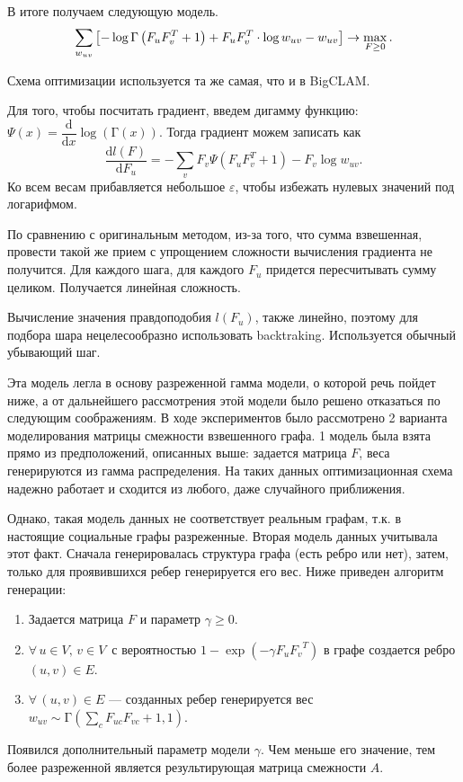 \documentclass{ITaSconf}
\begin{document}
В итоге получаем следующую модель.
$$
\sum_{w_{uv}}\left[-\log\mathrm{\Gamma}\left( F_u F_v^T + 1 \right) + F_u F_v^T \cdot\log w_{uv} - w_{uv}\right] \rightarrow \max_{F\ge 0}. \\
$$

Схема оптимизации используется та же самая, что и в BigCLAM.

Для того, чтобы посчитать градиент, введем дигамму функцию: $\Psi(x) = \dfrac{\mathrm{d}}{\mathrm{d}x} \log\left(\mathrm\Gamma(x)\right)$.
Тогда градиент можем записать как
$$\dfrac{\mathrm{d}l(F)}{\mathrm{d}F_u} = - \sum_v F_v \Psi\left(F_u F_v^T + 1\right) - F_v \log w_{uv}.$$
Ко всем весам прибавляется небольшое $\varepsilon$, чтобы избежать нулевых значений под логарифмом.

По сравнению с оригинальным методом, из-за того, что сумма взвешенная, провести такой же прием с упрощением сложности вычисления градиента не получится. 
Для каждого шага, для каждого $F_u$ придется пересчитывать сумму целиком. 
Получается линейная сложность. 

Вычисление значения правдоподобия $l(F_u)$, также линейно, поэтому для подбора шара нецелесообразно использовать backtraking. 
Используется обычный убывающий шаг.

Эта модель легла в основу разреженной гамма модели, о которой речь пойдет ниже, а от дальнейшего рассмотрения этой модели было решено отказаться по следующим соображениям.
В ходе экспериментов было рассмотрено 2 варианта моделирования матрицы смежности взвешенного графа.
1 модель была взята прямо из предположений, описанных выше: задается матрица $F$, веса генерируются из гамма распределения.
На таких данных оптимизационная схема надежно работает и сходится из любого, даже случайного приближения.

Однако, такая модель данных не соответствует реальным графам, т.к. в настоящие социальные графы разреженные. 
Вторая модель данных учитывала этот факт. 
Сначала генерировалась структура графа (есть ребро или нет), затем, только для проявившихся ребер генерируется его вес. 
Ниже приведен алгоритм генерации:
\begin{enumerate}
	\item Задается матрица $F$ и параметр $\gamma \ge 0 $.
	\item $\forall\, u \in V, \, v \in V \,$ с вероятностью $1 - \exp(-\gamma F_u {F_v}^T)$ в графе создается ребро $(u, v) \in E$.
	\item $\forall\, (u, v) \in E$ --- созданных ребер генерируется вес $w_{uv} \sim \mathrm{\Gamma}\left(\sum_c F_{uc} F_{vc} + 1, 1\right)$.
\end{enumerate}
Появился дополнительный параметр модели $\gamma$. 
Чем меньше его значение, тем более разреженной является результирующая матрица смежности $A$.
\end{document}
